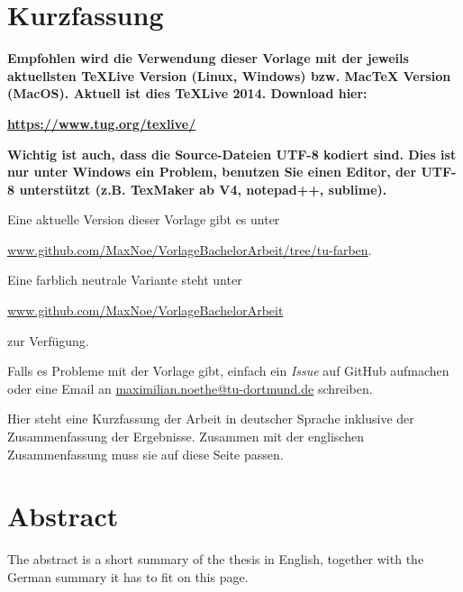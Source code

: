 \thispagestyle{plain}
\section*{Kurzfassung}

\textbf{\large Empfohlen wird die Verwendung dieser Vorlage mit der jeweils aktuellsten TeXLive Version (Linux, Windows) bzw. MacTeX Version (MacOS).
Aktuell ist dies TeXLive 2014. Download hier: }

\href{https://www.tug.org/texlive/}{\textbf{\large https://www.tug.org/texlive/}}

\textbf{\large
Wichtig ist auch, dass die Source-Dateien UTF-8 kodiert sind. Dies
ist nur unter Windows ein Problem, benutzen Sie einen Editor, der
UTF-8 unterstützt (z.B. TexMaker ab V4, notepad++, sublime).
}

Eine aktuelle Version dieser Vorlage gibt es unter 

\href{https://github.com/MaxNoe/VorlageBachelorArbeit/tree/tu-farben}{www.github.com/MaxNoe/VorlageBachelorArbeit/tree/tu-farben}.

Eine farblich neutrale Variante steht unter  

\href{https://github.com/MaxNoe/VorlageBachelorArbeit}{www.github.com/MaxNoe/VorlageBachelorArbeit}

zur Verfügung.

Falls es Probleme mit der Vorlage gibt, einfach ein \emph{Issue} auf GitHub aufmachen oder eine Email an
\href{mailto:maximilian.noethe@tu-dortmund.de}{maximilian.noethe@tu-dortmund.de} schreiben.


Hier steht eine Kurzfassung der Arbeit in deutscher Sprache inklusive der Zusammenfassung der
Ergebnisse.
Zusammen mit der englischen Zusammenfassung muss sie auf diese Seite passen.

\section*{Abstract}

The abstract is a short summary of the thesis in English, together with the German summary it has to fit on this page.

